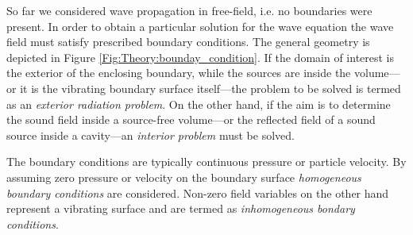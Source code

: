 So far we considered wave propagation in free-field, i.e. no boundaries were present.
In order to obtain a particular solution for the wave equation the wave field must satisfy prescribed boundary conditions.
The general geometry is depicted in Figure \ref{Fig:Theory:bounday_condition}.
If the domain of interest is the exterior of the enclosing boundary, while the sources are inside the volume---or it is the vibrating boundary surface itself---the problem to be solved is termed as an \emph{exterior radiation problem}. 
On the other hand, if the aim is to determine the sound field inside a source-free volume---or the reflected field of a sound source inside a cavity---an \emph{interior problem} must be solved.

The boundary conditions are typically continuous pressure or particle velocity. 
By assuming zero pressure or velocity on the boundary surface \emph{homogeneous boundary conditions} are considered. 
Non-zero field variables on the other hand represent a vibrating surface and are termed as \emph{inhomogeneous bondary conditions}.

